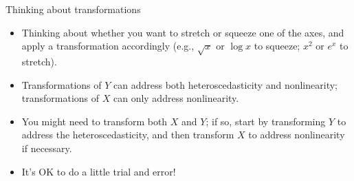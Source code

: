 \documentclass{beamer}\usepackage[]{graphicx}\usepackage[]{color}
\begin{document}
\begin{darkframes}
    \begin{frame}{Thinking about transformations}
      \begin{itemize}[<+->]
        \item Thinking about whether you want to stretch or squeeze one of the axes, and apply a transformation accordingly (e.g., $\sqrt x$ or $\log x$ to squeeze; $x^2$ or $e^x$ to stretch).
        \item Transformations of $Y$ can address both heteroscedasticity and nonlinearity; transformations of $X$ can only address nonlinearity.
        \item You might need to transform both $X$ and $Y$; if so, start by transforming $Y$ to address the heteroscedasticity, and then transform $X$ to address nonlinearity if necessary.
        \item It's OK to do a little trial and error!
      \end{itemize}
    \end{frame}
  \end{darkframes}
\end{document}
